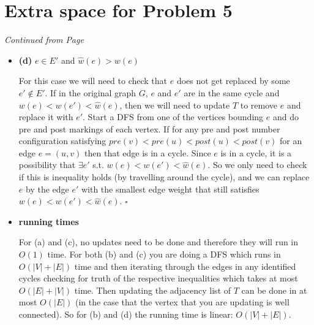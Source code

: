 \documentclass[11pt]{article}
\begin{document}
\section*{Extra space for Problem 5}
\emph{Continued from Page \pageref{pg:end-of-p5}}\\

\begin{itemize}
  \item[] \textbf{(d)} $e \in E'$ and $\hat{w}(e) > w(e)$

   For this case we will need to check that $e$ does not get replaced by some $e'\not\in E'$. If in the original graph $G$, $e$ and $e'$ are in the same cycle and $w(e)<w(e')<\hat{w}(e)$, then we will need to update $T$ to remove $e$ and replace it with $e'$. Start a DFS from one of the vertices bounding $e$ and do pre and post markings of each vertex. If for any pre and post number configuration satisfying $pre(v)<pre(u)<post(u)<post(v)$ for an edge $e=(u,v)$ then that edge is in a cycle. Since $e$ is in a cycle, it is a possibility that $\exists e'$ s.t. $w(e)<w(e')<\hat{w}(e)$. So we only need to check if this is inequality holds (by travelling around the cycle), and we can replace $e$ by the edge $e'$ with the smallest edge weight that still satisfies $w(e)<w(e')<\hat{w}(e)$. $\square$
  \item[] \textbf{running times}

   For (a) and (c), no updates need to be done and therefore they will run in $O(1)$ time. For both (b) and (c) you are doing a DFS which runs in $O(|V|+|E|)$ time and then iterating through the edges in any identified cycles checking for truth of the respective inequalities which takes at most $O(|E|+|V|)$ time. Then updating the adjacency list of $T$ can be done in at most $O(|E|)$ (in the case that the vertex that you are updating is well connected). So for (b) and (d) the running time is linear: $O(|V|+|E|)$.

\end{itemize}
\label{pg:p5-continuation}
\newpage






\end{document}
